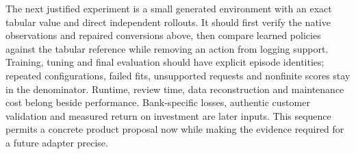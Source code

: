The next justified experiment is a small generated environment with an exact
tabular value and direct independent rollouts. It should first verify the
native observations and repaired conversions above, then compare learned
policies against the tabular reference while removing an action from logging
support. Training, tuning and final evaluation should have explicit episode
identities; repeated configurations, failed fits, unsupported requests and
nonfinite scores stay in the denominator. Runtime, review time, data
reconstruction and maintenance cost belong beside performance. Bank-specific
losses, authentic customer validation and measured return on investment are
later inputs. This sequence permits a concrete product proposal now while
making the evidence required for a future adapter precise.
\citep{exec15_d3rlpy_contract}

\label{exec15:d3rlpy-contract-end}
